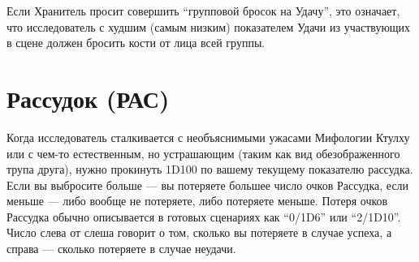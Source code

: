 \documentclass[letterpaper,twocolumn,openany, twoside, 11pt, usenames]{cocbook}
\begin{document}
Если Хранитель просит совершить ``групповой бросок на Удачу'', это означает, что исследователь с худшим (самым низким) показателем Удачи из участвующих в сцене должен бросить кости от лица всей группы.
\smallbreak
\noindent {}

\section*{Рассудок (РАС)}

Когда исследователь сталкивается с необъяснимыми ужасами Мифологии Ктулху или с чем-то естественным, но устрашающим (таким как вид обезображенного трупа друга), нужно прокинуть 1D100 по вашему текущему показателю рассудка. Если вы выбросите больше --- вы потеряете большее число очков Рассудка, если меньше --- либо вообще не потеряете, либо потеряете меньше. Потеря очков Рассудка обычно описывается в готовых сценариях как ``0/1D6'' или ``2/1D10''. Число слева от слеша говорит о том, сколько вы потеряете в случае успеха, а справа --- сколько потеряете в случае неудачи.
\end{document}
